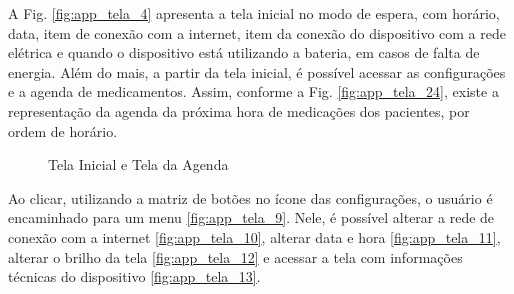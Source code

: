 \begin{apendicesenv}
A Fig. \ref{fig:app_tela_4} apresenta a tela inicial no modo de espera, com horário, data, item de conexão com a internet, item da conexão do dispositivo com a rede elétrica e quando o dispositivo está utilizando a bateria, em casos de falta de energia. Além do mais, a partir da tela inicial, é possível acessar as configurações e a agenda de medicamentos. Assim, conforme a Fig. \ref{fig:app_tela_24}, existe a representação da agenda da próxima hora de medicações dos pacientes, por ordem de horário.

\begin{figure}[!htb]
    \centering
    \caption{Tela Inicial e Tela da Agenda}\label{fig:telas_4_24}
\end{figure}

Ao clicar, utilizando a matriz de botões no ícone das configurações, o usuário é encaminhado para um menu \ref{fig:app_tela_9}. Nele, é possível alterar a rede de conexão com a internet \ref{fig:app_tela_10}, alterar data e hora \ref{fig:app_tela_11}, alterar o brilho da tela \ref{fig:app_tela_12} e acessar a tela com informações técnicas do dispositivo \ref{fig:app_tela_13}.


\end{apendicesenv}
